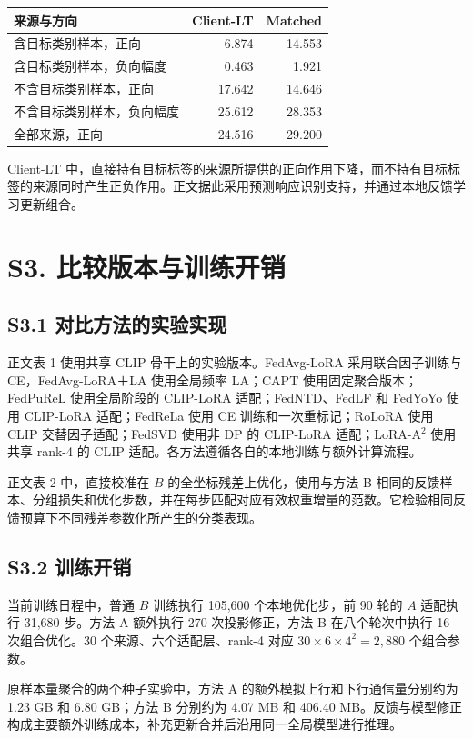 \documentclass[10pt,twocolumn,letterpaper]{article}
\begin{document}
\par\medskip\noindent\begin{minipage}{\columnwidth}\centering{}\small\setlength{\tabcolsep}{3pt}

\begin{tabularx}{\columnwidth}{Xrr}\toprule 来源与方向 & Client-LT & Matched \\\midrule

含目标类别样本，正向 & 6.874 & 14.553 \\

含目标类别样本，负向幅度 & 0.463 & 1.921 \\

不含目标类别样本，正向 & 17.642 & 14.646 \\

不含目标类别样本，负向幅度 & 25.612 & 28.353 \\

全部来源，正向 & 24.516 & 29.200 \\

\bottomrule\end{tabularx}\end{minipage}\par\medskip

Client-LT 中，直接持有目标标签的来源所提供的正向作用下降，而不持有目标标签的来源同时产生正负作用。正文据此采用预测响应识别支持，并通过本地反馈学习更新组合。


\section*{S3. 比较版本与训练开销}

\subsection*{S3.1 对比方法的实验实现}

正文表 1 使用共享 CLIP 骨干上的实验版本。FedAvg-LoRA 采用联合因子训练与 CE，FedAvg-LoRA＋LA 使用全局频率 LA；CAPT 使用固定聚合版本；FedPuReL 使用全局阶段的 CLIP-LoRA 适配；FedNTD、FedLF 和 FedYoYo 使用 CLIP-LoRA 适配；FedReLa 使用 CE 训练和一次重标记；RoLoRA 使用 CLIP 交替因子适配；FedSVD 使用非 DP 的 CLIP-LoRA 适配；LoRA-A$^2$ 使用共享 rank-4 的 CLIP 适配。各方法遵循各自的本地训练与额外计算流程。


正文表 2 中，直接校准在 $B$ 的全坐标残差上优化，使用与方法 B 相同的反馈样本、分组损失和优化步数，并在每步匹配对应有效权重增量的范数。它检验相同反馈预算下不同残差参数化所产生的分类表现。


\subsection*{S3.2 训练开销}

当前训练日程中，普通 $B$ 训练执行 105,600 个本地优化步，前 90 轮的 $A$ 适配执行 31,680 步。方法 A 额外执行 270 次投影修正，方法 B 在八个轮次中执行 16 次组合优化。30 个来源、六个适配层、rank-4 对应 $30\times6\times4^2=2,880$ 个组合参数。


原样本量聚合的两个种子实验中，方法 A 的额外模拟上行和下行通信量分别约为 1.23 GB 和 6.80 GB；方法 B 分别约为 4.07 MB 和 406.40 MB。反馈与模型修正构成主要额外训练成本，补充更新合并后沿用同一全局模型进行推理。
\end{document}
